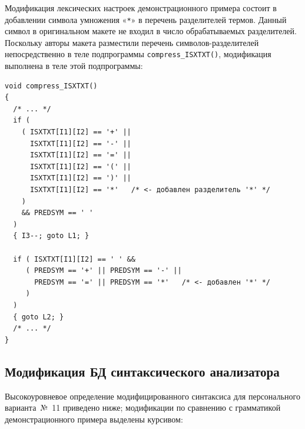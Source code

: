 \documentclass[a4paper,14pt]{extarticle}
\begin{document}
Модификация лексических настроек демонстрационного примера состоит в добавлении
символа умножения «\texttt{*}» в перечень разделителей термов. Данный символ в
оригинальном макете не входил в число обрабатываемых разделителей. Поскольку авторы
макета разместили перечень символов-разделителей непосредственно в теле подпрограммы
\texttt{compress\_ISXTXT()}, модификация выполнена в теле этой подпрограммы:

\begin{lstlisting}[style=Cstyle,caption={Фрагмент \texttt{compress\_ISXTXT()} с добавленным символом «\texttt{*}»},label=lst:lex]
void compress_ISXTXT()
{
  /* ... */
  if (
    ( ISXTXT[I1][I2] == '+' ||
      ISXTXT[I1][I2] == '-' ||
      ISXTXT[I1][I2] == '=' ||
      ISXTXT[I1][I2] == '(' ||
      ISXTXT[I1][I2] == ')' ||
      ISXTXT[I1][I2] == '*'   /* <- добавлен разделитель '*' */
    )
    && PREDSYM == ' '
  )
  { I3--; goto L1; }

  if ( ISXTXT[I1][I2] == ' ' &&
     ( PREDSYM == '+' || PREDSYM == '-' ||
       PREDSYM == '=' || PREDSYM == '*'   /* <- добавлен '*' */
     )
  )
  { goto L2; }
  /* ... */
}
\end{lstlisting}

\subsection{Модификация БД синтаксического анализатора}

Высокоуровневое определение модифицированного синтаксиса для персонального
варианта~№~11 приведено ниже; модификации по сравнению с грамматикой
демонстрационного примера выделены курсивом:
\end{document}
